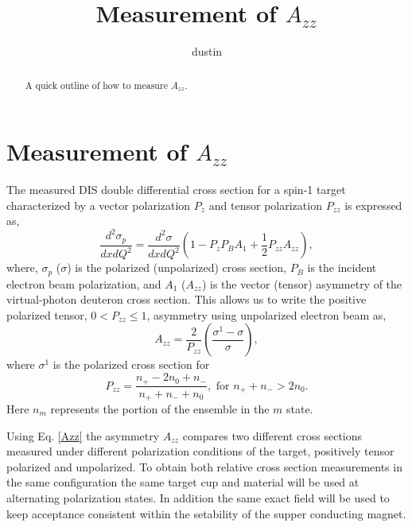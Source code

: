 \documentclass[12pt]{article}
\title{
Measurement of $A_{zz}$
}
\author{
dustin\\
}
\begin{document}
\maketitle

\begin{abstract}
A quick outline of how to measure $A_{zz}$.
\end{abstract}

\section{ Measurement of $A_{zz}$ }

The measured DIS double differential cross section for a spin-1 target characterized by a vector polarization $P_{z}$ and tensor polarization
$P_{zz}$ is expressed as,
\begin{equation}
\frac{d^2\sigma_p}{dxdQ^2}=\frac{d^2\sigma}{dxdQ^2}\left(1-P_zP_BA_1+\frac{1}{2}P_{zz}A_{zz}\right),
\label{eq:one}
\end{equation}
where, $\sigma_p$ ($\sigma$) is the polarized (unpolarized) cross section, $P_B$ is the incident electron beam polarization, and $A_1$ ($A_{zz}$) is the
vector (tensor) asymmetry of the virtual-photon deuteron cross section.  This allows us to write
the positive polarized tensor, $0<P_{zz}\leq 1$, asymmetry using unpolarized electron beam as,
\begin{equation}
\label{Azz}
A_{zz}=\frac{2}{P_{zz}}\left(\frac{\sigma^1-\sigma}{\sigma}\right),
\end{equation}
where $\sigma^1$ is the polarized cross section for
\begin{equation}
P_{zz}=\frac{n_+-2n_0+n_-}{n_++n_-+n_0},\mbox{ for~} n_++n_->2n_0.
\end{equation}
Here $n_m$ represents the portion of the ensemble in the $m$ state.

Using Eq. \ref{Azz} the asymmetry $A_{zz}$ compares two different cross sections measured under different 
polarization conditions of the target, positively tensor polarized and unpolarized.  
To obtain both relative cross section measurements in the same configuration the same target
cup and material will be used at alternating polarization states.  In addition the same exact field will be used to keep
acceptance consistent within the setability of the supper conducting magnet. 
\end{document}
